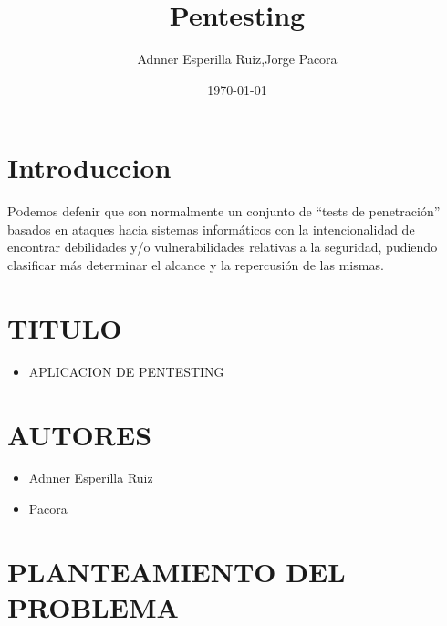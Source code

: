 \documentclass[twoside,twocolumn]{article}
\title{ Pentesting} %
\author{Adnner Esperilla Ruiz,Jorge Pacora}
\date{\today} %
\begin{document}
\maketitle


\section{Introduccion}

\lettrine[nindent=0em,lines=3]{P}odemos defenir que son normalmente un conjunto de “tests de penetración” basados en ataques hacia sistemas informáticos con la intencionalidad de encontrar debilidades y/o vulnerabilidades relativas a la seguridad, pudiendo clasificar más determinar el alcance y la repercusión de las mismas.

\section{TITULO}
\begin{itemize}
\item APLICACION DE PENTESTING
\end{itemize}
\section{AUTORES}
\begin{itemize}
\item Adnner Esperilla Ruiz
\item Pacora
\end{itemize}
\section{PLANTEAMIENTO DEL PROBLEMA}
\end{document}
